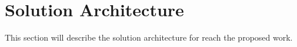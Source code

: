 \section{Solution Architecture}
\label{sec:Solution Architecture}
This section will describe the solution architecture for reach the proposed work.
